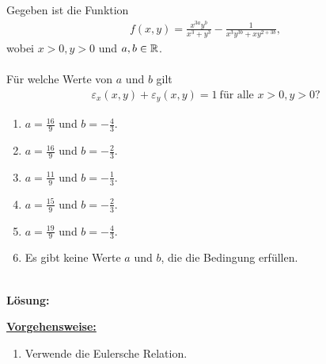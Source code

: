 \newpage

\subsection*{}
Gegeben ist die Funktion
\begin{align*}
	f(x,y)
	=
	\frac{x^{3a} y^b}{x^3 +y^3}
	- 
	\frac{1}{x^3 y^{3b} + x y^{2 + 3b}},
\end{align*}
wobei $ x > 0, y > 0 $ und $ a,b \in \mathbb{R} $.\\
\\
Für welche Werte von $ a $ und $ b $ gilt
\begin{align*}
	\varepsilon_x(x,y) + \varepsilon_y(x,y) = 1 \ \textrm{für alle } x>0, y>0\textrm{?}
\end{align*}
\renewcommand{\labelenumi}{(\alph{enumi})}
\begin{enumerate}
	\item 
	$a = \frac{16}{9}$ und $ b=-\frac{4}{3} $.
	\item
	$a = \frac{16}{9}$ und $ b=-\frac{2}{3} $.
	\item
	$a = \frac{11}{9}$ und $ b=-\frac{1}{3} $.
	\item
	$a = \frac{15}{9}$ und $ b=-\frac{2}{3} $.
	\item
	$a = \frac{19}{9}$ und $ b=-\frac{4}{3} $.
	\item
	Es gibt keine Werte $ a $ und $ b $, die die Bedingung erfüllen.
\end{enumerate}
\ \\
\textbf{Lösung:}
\begin{mdframed}
\underline{\textbf{Vorgehensweise:}}
\renewcommand{\labelenumi}{\theenumi.}
\begin{enumerate}
\item Verwende die Eulersche Relation.
\end{enumerate}
\end{mdframed}

